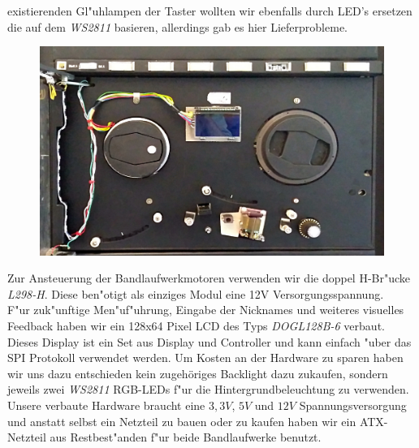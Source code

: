 \documentclass[a4paper]{article}
\begin{document}
    existierenden Gl"uhlampen der Taster wollten wir ebenfalls durch LED's
    ersetzen die auf dem \textit{WS2811} basieren, allerdings gab es hier
    Lieferprobleme.\\
    \begin{figure}
      \centering
      \label{figure:Bandlaufwerke}
      \includegraphics[scale=0.075]{Frontansicht.jpg}
    \end{figure}
    Zur Ansteuerung der Bandlaufwerkmotoren verwenden wir die doppel H-Br"ucke
    \textit{L298-H}. Diese ben"otigt als einziges Modul eine 12V
    Versorgungsspannung.\\ F"ur zuk"unftige Men"uf"uhrung, Eingabe der
    Nicknames und weiteres visuelles Feedback haben wir ein 128x64 Pixel LCD
    des Typs \textit{DOGL128B-6} verbaut. Dieses Display ist ein Set aus
    Display und Controller und kann einfach "uber das SPI Protokoll verwendet
    werden. Um Kosten an der Hardware zu sparen haben wir uns dazu entschieden
    kein zugehöriges Backlight dazu zukaufen, sondern jeweils zwei
    \textit{WS2811} RGB-LEDs f"ur die Hintergrundbeleuchtung zu verwenden.\\
    Unsere verbaute Hardware braucht eine \( 3,3 V \), \( 5 V \) und \( 12 V \)
    Spannungsversorgung und anstatt selbst ein Netzteil zu bauen
    oder zu kaufen haben wir ein ATX-Netzteil aus Restbest"anden f"ur beide
    Bandlaufwerke benutzt.
\end{document}

